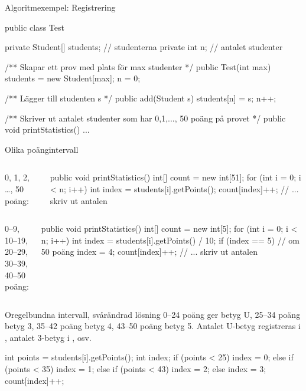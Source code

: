 \documentclass{lecturenotes}
\begin{document}
\begin{Slide}{Algoritmexempel: Registrering}


\begin{Code}
public class Test {
    private Student[] students; // studenterna
    private int n;              // antalet studenter

    /** Skapar ett prov med plats för max studenter */
    public Test(int max) {
        students = new Student[max];
        n = 0;
    }
    
    /** Lägger till studenten s */
    public add(Student s) {
        students[n] = s;
        n++;
    }
    
    /** Skriver ut antalet studenter som har 0,1,...,
        50 poäng på provet */
    public void printStatistics() { ... }
}
\end{Code}
\end{Slide} 

\begin{Slide}{Olika poängintervall}
\lstset{xleftmargin=0mm}

\begin{columns}
\column{2cm}
0, 1, 2, \ldots, 50 poäng:
\column{8cm}
\begin{Code}
public void printStatistics() {
    int[] count = new int[51];
    for (int i = 0; i < n; i++) {
        int index = students[i].getPoints();
        count[index]++;
    }
    // ... skriv ut antalen                       
}
\end{Code}
\end{columns}

\begin{columns}
\column{2cm}
0--9, 10--19,\\ 20--29, 30--39, \\40--50 poäng:
\column{8cm}
\begin{Code}
public void printStatistics() {
    int[] count = new int[5];
    for (int i = 0; i < n; i++) {
        int index = students[i].getPoints() / 10;
        if (index == 5) { // om 50 poäng
            index = 4;
        }
        count[index]++;
    }
    // ... skriv ut antalen  
}
\end{Code}
\end{columns}
\lstset{xleftmargin=\parindent}
\end{Slide} 

\begin{Slide}{Oregelbundna intervall, svårändrad lösning}
0--24 poäng ger betyg U, 25--34 poäng betyg 3, 35--42 poäng betyg 4, 43--50 poäng betyg 5. Antalet U-betyg registreras i , antalet 3-betyg i , osv.
\begin{Code}
int points = students[i].getPoints();
int index;
if (points < 25) {
    index = 0;
} else if (points < 35) {
    index = 1;
} else if (points < 43) {
    index = 2;
} else {
    index = 3;
}
count[index]++;
\end{Code}
\end{Slide} 
\end{document}
